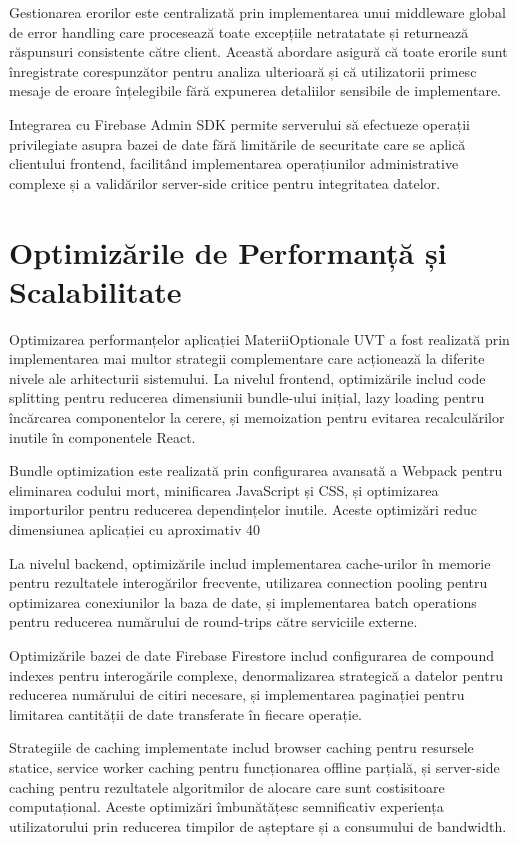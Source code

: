 \documentclass[12pt,a4paper]{report}
\begin{document}
Gestionarea erorilor este centralizată prin implementarea unui middleware global de error handling care procesează toate excepțiile netratatate și returnează răspunsuri consistente către client. Această abordare asigură că toate erorile sunt înregistrate corespunzător pentru analiza ulterioară și că utilizatorii primesc mesaje de eroare înțelegibile fără expunerea detaliilor sensibile de implementare.

Integrarea cu Firebase Admin SDK permite serverului să efectueze operații privilegiate asupra bazei de date fără limitările de securitate care se aplică clientului frontend, facilitând implementarea operațiunilor administrative complexe și a validărilor server-side critice pentru integritatea datelor.

\section{Optimizările de Performanță și Scalabilitate}

Optimizarea performanțelor aplicației MateriiOptionale UVT a fost realizată prin implementarea mai multor strategii complementare care acționează la diferite nivele ale arhitecturii sistemului. La nivelul frontend, optimizările includ code splitting pentru reducerea dimensiunii bundle-ului inițial, lazy loading pentru încărcarea componentelor la cerere, și memoization pentru evitarea recalculărilor inutile în componentele React.

Bundle optimization este realizată prin configurarea avansată a Webpack pentru eliminarea codului mort, minificarea JavaScript și CSS, și optimizarea importurilor pentru reducerea dependințelor inutile. Aceste optimizări reduc dimensiunea aplicației cu aproximativ 40%

La nivelul backend, optimizările includ implementarea cache-urilor în memorie pentru rezultatele interogărilor frecvente, utilizarea connection pooling pentru optimizarea conexiunilor la baza de date, și implementarea batch operations pentru reducerea numărului de round-trips către serviciile externe.

Optimizările bazei de date Firebase Firestore includ configurarea de compound indexes pentru interogările complexe, denormalizarea strategică a datelor pentru reducerea numărului de citiri necesare, și implementarea paginației pentru limitarea cantității de date transferate în fiecare operație.

Strategiile de caching implementate includ browser caching pentru resursele statice, service worker caching pentru funcționarea offline parțială, și server-side caching pentru rezultatele algoritmilor de alocare care sunt costisitoare computațional. Aceste optimizări îmbunătățesc semnificativ experiența utilizatorului prin reducerea timpilor de așteptare și a consumului de bandwidth.
\end{document}
